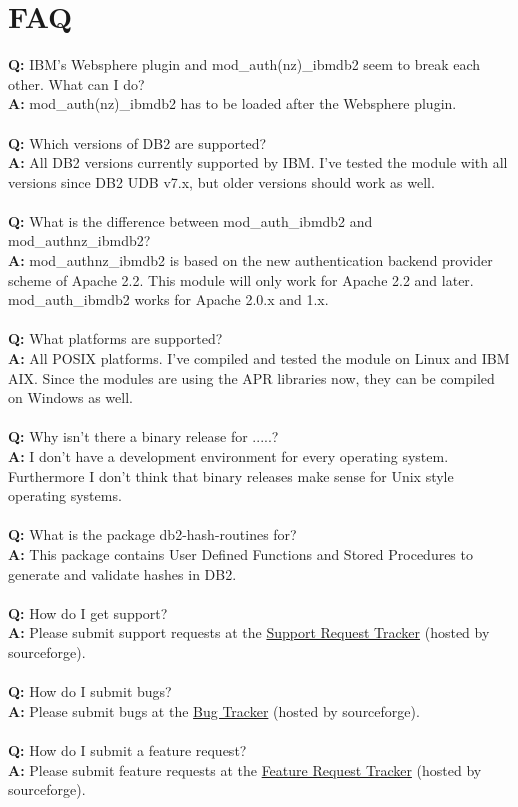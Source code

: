 \section{FAQ}
\textbf{Q:} IBM's Websphere plugin and mod\_auth(nz)\_ibmdb2 seem to break each other. What can I do? \\
\textbf{A:} mod\_auth(nz)\_ibmdb2 has to be loaded after the Websphere plugin. \\
\\
\textbf{Q:} Which versions of DB2 are supported? \\
\textbf{A:} All DB2 versions currently supported by IBM. I've tested the module with all versions since DB2 UDB v7.x, but older versions should work as well. \\
\\
\textbf{Q:} What is the difference between mod\_auth\_ibmdb2 and mod\_authnz\_ibmdb2? \\
\textbf{A:} mod\_authnz\_ibmdb2 is based on the new authentication backend provider scheme of Apache 2.2. This module will only work for Apache 2.2 and later. \linebreak[4] mod\_auth\_ibmdb2 works for Apache 2.0.x and 1.x. \\
\\
\textbf{Q:} What platforms are supported? \\
\textbf{A:} All POSIX platforms. I've compiled and tested the module on Linux and IBM AIX. Since the modules are using the APR libraries now, they can be compiled on Windows as well. \\
\\
\textbf{Q:} Why isn't there a binary release for .....? \\
\textbf{A:} I don't have a development environment for every operating system. Furthermore I don't think that binary releases make sense for Unix style operating systems. \\
\\
\textbf{Q:} What is the package db2-hash-routines for? \\
\textbf{A:} This package contains User Defined Functions and Stored Procedures to generate and validate hashes in DB2. \\
\\
\textbf{Q:} How do I get support? \\
\textbf{A:} Please submit support requests at the \href{http://sf.net/p/mod-auth-ibmdb2/support-requests}{Support Request Tracker} (hosted by sourceforge). \\
\\
\textbf{Q:} How do I submit bugs? \\
\textbf{A:} Please submit bugs at the \href{http://sf.net/p/mod-auth-ibmdb2/bugs}{Bug Tracker} (hosted by sourceforge). \\
\\
\textbf{Q:} How do I submit a feature request? \\
\textbf{A:} Please submit feature requests at the \href{http://sf.net/p/mod-auth-ibmdb2/feature-requests}{Feature Request Tracker} (hosted by sourceforge).
